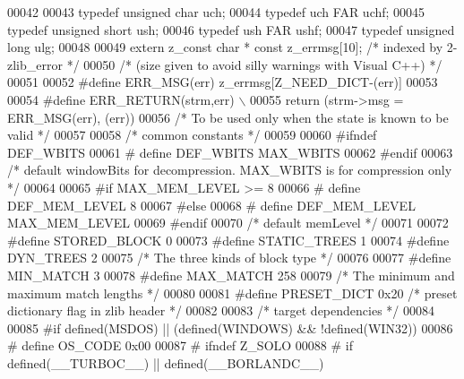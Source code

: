 \begin{DoxyCode}
00042 
00043 \textcolor{keyword}{typedef} \textcolor{keywordtype}{unsigned} \textcolor{keywordtype}{char}  uch;
00044 \textcolor{keyword}{typedef} uch FAR uchf;
00045 \textcolor{keyword}{typedef} \textcolor{keywordtype}{unsigned} \textcolor{keywordtype}{short} ush;
00046 \textcolor{keyword}{typedef} ush FAR ushf;
00047 \textcolor{keyword}{typedef} \textcolor{keywordtype}{unsigned} \textcolor{keywordtype}{long}  ulg;
00048 
00049 \textcolor{keyword}{extern} z\_const \textcolor{keywordtype}{char} * \textcolor{keyword}{const} z\_errmsg[10]; \textcolor{comment}{/* indexed by 2-zlib\_error */}
00050 \textcolor{comment}{/* (size given to avoid silly warnings with Visual C++) */}
00051 
00052 \textcolor{preprocessor}{#define ERR\_MSG(err) z\_errmsg[Z\_NEED\_DICT-(err)]}
00053 
00054 \textcolor{preprocessor}{#define ERR\_RETURN(strm,err) \(\backslash\)}
00055 \textcolor{preprocessor}{  return (strm->msg = ERR\_MSG(err), (err))}
00056 \textcolor{comment}{/* To be used only when the state is known to be valid */}
00057 
00058         \textcolor{comment}{/* common constants */}
00059 
00060 \textcolor{preprocessor}{#ifndef DEF\_WBITS}
00061 \textcolor{preprocessor}{#  define DEF\_WBITS MAX\_WBITS}
00062 \textcolor{preprocessor}{#endif}
00063 \textcolor{comment}{/* default windowBits for decompression. MAX\_WBITS is for compression only */}
00064 
00065 \textcolor{preprocessor}{#if MAX\_MEM\_LEVEL >= 8}
00066 \textcolor{preprocessor}{#  define DEF\_MEM\_LEVEL 8}
00067 \textcolor{preprocessor}{#else}
00068 \textcolor{preprocessor}{#  define DEF\_MEM\_LEVEL  MAX\_MEM\_LEVEL}
00069 \textcolor{preprocessor}{#endif}
00070 \textcolor{comment}{/* default memLevel */}
00071 
00072 \textcolor{preprocessor}{#define STORED\_BLOCK 0}
00073 \textcolor{preprocessor}{#define STATIC\_TREES 1}
00074 \textcolor{preprocessor}{#define DYN\_TREES    2}
00075 \textcolor{comment}{/* The three kinds of block type */}
00076 
00077 \textcolor{preprocessor}{#define MIN\_MATCH  3}
00078 \textcolor{preprocessor}{#define MAX\_MATCH  258}
00079 \textcolor{comment}{/* The minimum and maximum match lengths */}
00080 
00081 \textcolor{preprocessor}{#define PRESET\_DICT 0x20 }\textcolor{comment}{/* preset dictionary flag in zlib header */}\textcolor{preprocessor}{}
00082 
00083         \textcolor{comment}{/* target dependencies */}
00084 
00085 \textcolor{preprocessor}{#if defined(MSDOS) || (defined(WINDOWS) && !defined(WIN32))}
00086 \textcolor{preprocessor}{#  define OS\_CODE  0x00}
00087 \textcolor{preprocessor}{#  ifndef Z\_SOLO}
00088 \textcolor{preprocessor}{#    if defined(\_\_TURBOC\_\_) || defined(\_\_BORLANDC\_\_)}

\end{DoxyCode}
